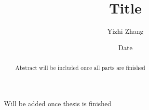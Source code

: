 \documentclass{iitthesis}
\theoremstyle{definition}
\theoremstyle{remark}
\begin{document}
\title{Title}
\author{Yizhi Zhang}
\date{Date}
\copyrightnoticetrue      %
\maketitle                %


\prelimpages         %


\begin{acknowledgement}     %
\par  Will be added once thesis is finished
\end{acknowledgement}


\tableofcontents
\clearpage

\listoftables

\clearpage

\listoffigures

\clearpage


\listofsymbols

 \clearpage



\begin{abstract}           %
\par Abstract will be included once all parts are finished
\end{abstract}


\textpages     %

\end{document}
